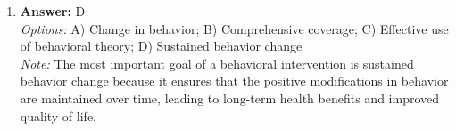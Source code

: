 \documentclass[12pt]{article}
\begin{document}
\begin{enumerate}[label=\arabic*.]
\\ \textit{Note:} Transfusion blood is screened to ensure that it is free from parvoviruses, thereby reducing the risk of transmission and protecting patients from potential viral infections associated with blood transfusions.
\item \textbf{Answer:} D
\\ \textit{Options:} A) Change in behavior; B) Comprehensive coverage; C) Effective use of behavioral theory; D) Sustained behavior change
\\ \textit{Note:} The most important goal of a behavioral intervention is sustained behavior change because it ensures that the positive modifications in behavior are maintained over time, leading to long-term health benefits and improved quality of life.
\end{enumerate}
\end{document}
